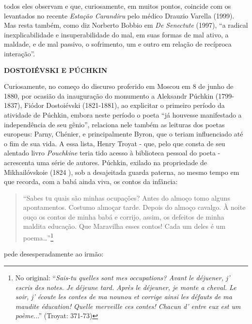 todos eles observam e que, curiosamente, em muitos pontos, coincide com
os levantados no recente \emph{Estação Carandiru} pelo médico Drauzio
Varella (1999). Mas resta também, como diz Norberto Bobbio em \emph{De
Senectute} (1997), ``a radical inexplicabilidade e insuperabilidade do
mal, em suas formas de mal ativo, a maldade, e de mal passivo, o
sofrimento, um e outro em relação de recíproca interação''.

\textbf{DOSTOIÉVSKI E PÚCHKIN}

Curiosamente, no começo do discurso proferido em Moscou em 8 de junho de
1880, por ocasião da inauguração do monumento a Aleksandr Púchkin
(1799-1837), Fiódor Dostoiévski (1821-1881), ao explicitar o primeiro
período da atividade de Púchkin, embora neste período o poeta ``já
houvesse manifestado a independência de seu gênio'', relaciona nele
também as leituras dos poetas europeus: Parny, Chénier, e principalmente
Byron, que o teriam influenciado até o fim de sua vida. A essa lista,
Henry Troyat - que, pelo que consta de seu alentado livro
\emph{Pouchkine} teria tido acesso à biblioteca pessoal do poeta -
acrescenta uma série de autores. Púchkin, exilado na propriedade de
Mikhailóvskoie (1824 ), sob a desajeitada guarda paterna, ao mesmo tempo
em que recorda, com a babá ainda viva, os contos da infância:

\begin{quote}
``Sabes tu quais são minhas ocupações? Antes do almoço tomo alguns
apontamentos. Costumo almoçar tarde. Depois do almoço cavalgo. À noite
ouço os contos de minha babá e corrijo, assim, os defeitos de minha
maldita educação. Que Maravilha esses contos! Cada um deles é um
poema\ldots{}''\footnote{No original: ``\emph{Sais-tu quelles sont mes
  occupations? Avant le déjuener, j' escris des notes. Je déjeune tard.
  Après le déjeuner, je monte a cheval. Le soir, j' écoute les contes de
  ma nounou et corrige ainsi les défauts de ma maudite éducation! Quelle
  merveille ces contes! Chacun d' entre eux est um poème..}.'' (Troyat:
  371-73)}
\end{quote}

pede desesperadamente ao irmão:


